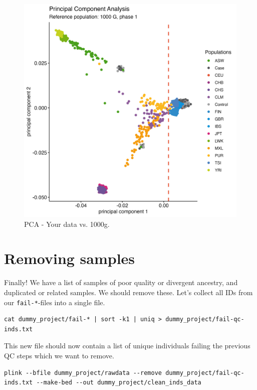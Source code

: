 \documentclass[
]{book}
\newcommand{\passthrough}[1]{#1}
\begin{document}
\begin{figure}[H]

{\centering \includegraphics[width=29.17in]{img/_gwas_dummy/gwas-qc-pca-1000g} 

}

\caption{PCA - Your data vs. 1000g.}\label{fig:show-pca-1000g}
\end{figure}

\hypertarget{removing-samples}{%
\section{Removing samples}\label{removing-samples}}

Finally! We have a list of samples of poor quality or divergent ancestry, and duplicated or related samples. We should remove these. Let's collect all IDs from our \passthrough{\lstinline!fail-*!}-files into a single file.

\begin{lstlisting}
cat dummy_project/fail-* | sort -k1 | uniq > dummy_project/fail-qc-inds.txt
\end{lstlisting}

This new file should now contain a list of unique individuals failing the previous QC steps which we want to remove.

\begin{lstlisting}
plink --bfile dummy_project/rawdata --remove dummy_project/fail-qc-inds.txt --make-bed --out dummy_project/clean_inds_data
\end{lstlisting}
\end{document}
